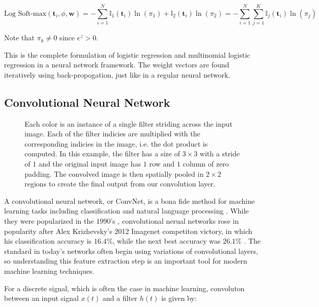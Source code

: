 \message{ !name(main.tex)}\documentclass[11pt]{article}
\begin{document}
\begin{equation} \label{eq:cross_entropy}
  \text{Log Soft-max}\left(\mathbf{t}_{i},\phi,\mathbf{w}\right) = - \sum_{i=1}^{N} \mathbb{I}_{1}\left(\mathbf{t}_{i}\right)\ln\left(\pi_{1}\right) + \mathbb{I}_{2}\left(\mathbf{t}_{i}\right)\ln\left(\pi_{2}\right) = - \sum_{i=1}^{N}  \sum_{j=1}^{K} \mathbb{I}_{j}\left(\mathbf{t}_{i}\right) \ln\left(\pi_{j}\right)
\end{equation}

Note that $\pi_{k} \neq 0$ since $e^{z} > 0$. 

This is the complete formulation of logistic regression and multinomial logistic regression in a neural network framework. The weight vectors are found iteratively using back-propogation, just like in a regular neural network.

\subsection{Convolutional Neural Network}

\begin{figure}[H]
  
  \caption{Each color is an instance of a single filter striding across the input image. Each of the filter indicies are multiplied with the corresponding indicies in the image, i.e. the dot product is computed. In this example, the filter has a size of $3\times3$ with a stride of $1$ and the original input image has $1$ row and $1$ column of zero padding. The convolved image is then spatially pooled in $2\times2$ regions to create the final output from our convolution layer.}
  \label{fig:conv_net}
\end{figure}

\par
A convolutional neural network, or ConvNet, is a bona fide method for machine learning tasks including classification and natural language processing \cite{Lecun98}\cite{alexnet}\cite{residual_cnn}\cite{oxford_vgg}\cite{nlp_cnn}. While they were popularized in the $1990$'s \cite{Lecun98}, convolutional nerual networks rose in popularity after Alex Krizhevsky's 2012 Imagenet competiton victory, in which his classification accuracy is $16.4\%$, while the next best accuracy was $26.1\%$ \cite{ILSVRC15}\cite{alexnet}. The standard in today's networks often begin using variations of convolutional layers, so understanding this feature extraction step is an important tool for modern machine learning techniques.

\par
For a discrete signal, which is often the case in machine learning, convoluton between an input signal $x(t)$ and a filter $h(t)$ is given by:
\end{document}
